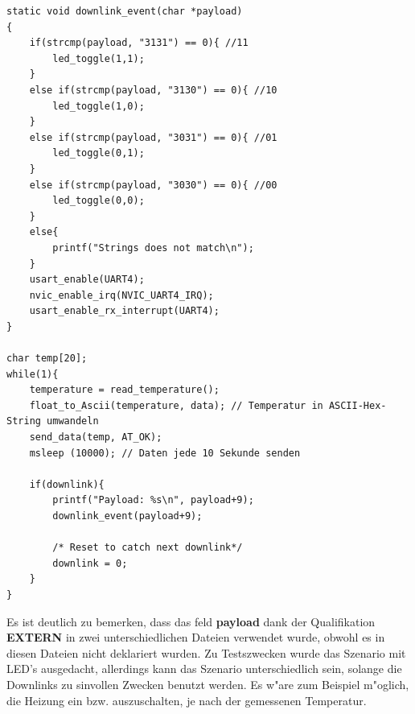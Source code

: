\vspace{1cm}
\begin{lstlisting}[frame=single]
static void downlink_event(char *payload)
{
	if(strcmp(payload, "3131") == 0){ //11
		led_toggle(1,1);
	}
	else if(strcmp(payload, "3130") == 0){ //10
		led_toggle(1,0);
	}
	else if(strcmp(payload, "3031") == 0){ //01
		led_toggle(0,1);
	}
	else if(strcmp(payload, "3030") == 0){ //00
		led_toggle(0,0);
	}
	else{
		printf("Strings does not match\n");
	}
	usart_enable(UART4);
	nvic_enable_irq(NVIC_UART4_IRQ);
	usart_enable_rx_interrupt(UART4);
}

char temp[20];
while(1){
	temperature = read_temperature();
	float_to_Ascii(temperature, data); // Temperatur in ASCII-Hex-String umwandeln
	send_data(temp, AT_OK);
	msleep (10000); // Daten jede 10 Sekunde senden

	if(downlink){
		printf("Payload: %s\n", payload+9);
		downlink_event(payload+9);

		/* Reset to catch next downlink*/
		downlink = 0;
	}
}
\end{lstlisting}
Es ist deutlich zu bemerken, dass das feld \textbf{payload} dank der Qualifikation 
\textbf{EXTERN} in zwei unterschiedlichen Dateien verwendet wurde, obwohl es in diesen 
Dateien nicht deklariert wurden.
Zu Testszwecken wurde das Szenario mit LED's ausgedacht, allerdings kann das Szenario 
unterschiedlich sein, solange die Downlinks zu sinvollen Zwecken benutzt werden. Es w"are 
zum Beispiel m"oglich, die Heizung ein bzw. auszuschalten, je nach der gemessenen 
Temperatur. 


